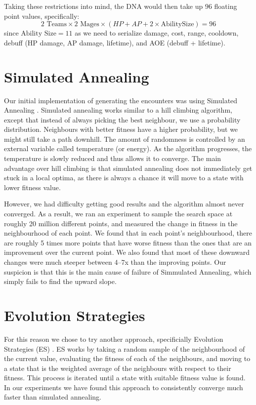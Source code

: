 Taking these restrictions into mind, the DNA would then take up $96$ floating point values,
specifically: $$2 \text{ Teams} \times 2 \text{ Mages} \times ( HP + AP + 2 \times \text{AbilitySize}) = 96$$ since $\text{Ability Size} = 11$ as we need to serialize damage, cost, range, cooldown,
debuff (HP damage, AP damage, lifetime), and AOE (debuff + lifetime).

\section{Simulated Annealing}

Our initial implementation of generating the encounters was using Simulated
Annealing \citep{ai-modern}. Simulated annealing works similar to a hill climbing algorithm, except
that instead of always picking the best neighbour, we use a probability distribution.
Neighbours with better fitness have a higher probability, but we might still take a path
downhill. The amount of randomness is controlled by an external variable called temperature (or energy).
As the algorithm progresses, the temperature is slowly reduced and thus allows it to converge.
The main advantage over hill climbing is that simulated annealing does not immediately get stuck in a local optima,
as there is always a chance it will move to a state with lower fitness value.

However, we had difficulty getting good results and the algorithm
almost never converged. As a result, we ran an experiment to sample the search space at roughly 20
million different points, and measured the change in fitness in the
neighbourhood of each point. We found that in each point's neighbourhood,
there are roughly 5 times more points that have worse fitness than the ones
that are an improvement over the current point. We also found that most of
these downward changes were much steeper between 4--7x than the improving
points. Our suspicion is that this is the main cause of failure of
Simmulated Annealing, which simply fails to find the upward slope.

\section{Evolution Strategies}

For this reason we chose to try another approach, specificially Evolution
Strategies (ES) \citep{evolution-strategies}. ES works by taking a random sample of the
neighbourhood of the current value, evaluating the fitness of each of the neighbours, and
moving to a state that is the weighted average of the neighbours with respect to their fitness.
This process is iterated until a state with suitable fitness value is found. In our experiments
we have found this approach to consistently converge much faster than simulated annealing.

